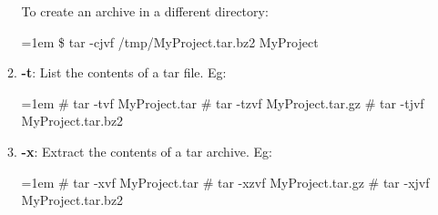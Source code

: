\begin{flushleft}
\begin{itemize}
\begin{enumerate}
			To create an archive in a different directory:
			\begin{tcolorbox}[breakable,notitle,boxrule=-0pt,colback=black,colframe=black]
				\color{green}
				\font=1em
				\$ tar -cjvf /tmp/MyProject.tar.bz2  MyProject
				\font=4pt
			\end{tcolorbox}		
			\newpage
			\item \textbf{-t}: List the contents of a tar file.
			\newline
			Eg: 
			\begin{tcolorbox}[breakable,notitle,boxrule=-0pt,colback=black,colframe=black]
				\color{green}
				\font=1em
				\# tar -tvf MyProject.tar
				\newline
				\color{green}
				\# tar -tzvf MyProject.tar.gz
				\newline
				\color{green}
				\#  tar -tjvf MyProject.tar.bz2
				\font=4pt
			\end{tcolorbox}		

			\item \textbf{-x}: Extract the contents of a tar archive.
			\newline
			Eg:
			\begin{tcolorbox}[breakable,notitle,boxrule=-0pt,colback=black,colframe=black]
				\color{green}
				\font=1em
				\# tar -xvf MyProject.tar
				\newline
				\# tar -xzvf MyProject.tar.gz
				\newline
				\# tar -xjvf MyProject.tar.bz2
				\font=4pt
			\end{tcolorbox}		
		\end{enumerate}
		\bigskip

		
	\end{itemize} 
	
\end{flushleft}

\newpage

